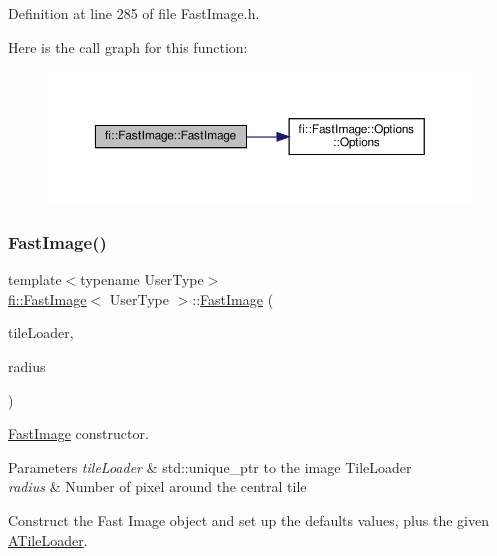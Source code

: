 Definition at line 285 of file Fast\+Image.\+h.

Here is the call graph for this function\+:
\nopagebreak
\begin{figure}[H]
\begin{center}
\leavevmode
\includegraphics[width=350pt]{dc/d6b/classfi_1_1FastImage_a1ac7484406bb49b685b27cab0ea2cbcf_cgraph}
\end{center}
\end{figure}
\mbox{\label{classfi_1_1FastImage_a0db8d5c797b4e6d13b09655d272ae22c}} 
\subsubsection{\texorpdfstring{Fast\+Image()}{FastImage()}\hspace{0.1cm}{\footnotesize\ttfamily [2/2]}}
{\footnotesize\ttfamily template$<$typename User\+Type$>$ \\
\hyperlink{classfi_1_1FastImage}{fi\+::\+Fast\+Image}$<$ User\+Type $>$\+::\hyperlink{classfi_1_1FastImage}{Fast\+Image} (\begin{DoxyParamCaption}\item[{std\+::unique\+\_\+ptr$<$ \hyperlink{classfi_1_1ATileLoader}{A\+Tile\+Loader}$<$ User\+Type $>$$>$}]{tile\+Loader,  }\item[{const uint32\+\_\+t \&}]{radius }\end{DoxyParamCaption})\hspace{0.3cm}{\ttfamily [inline]}}



\hyperlink{classfi_1_1FastImage}{Fast\+Image} constructor. 


\begin{DoxyParams}{Parameters}
{\em tile\+Loader} & std\+::unique\+\_\+ptr to the image Tile\+Loader \\
\hline
{\em radius} & Number of pixel around the central tile\\
\hline
\end{DoxyParams}
Construct the Fast Image object and set up the defaults values, plus the given \hyperlink{classfi_1_1ATileLoader}{A\+Tile\+Loader}. 

